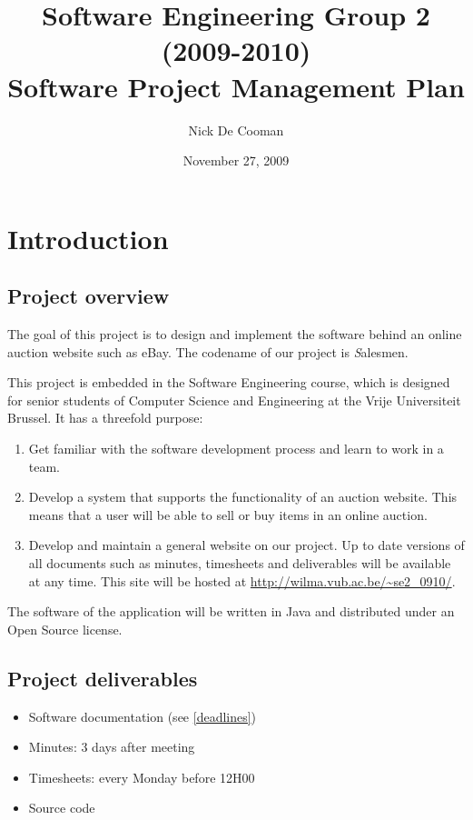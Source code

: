 \documentclass[a4paper, 12pt]{report}
\title{Software Engineering Group 2 (2009-2010) \\Software Project Management Plan}
\author{Nick De Cooman}
\date {November 27, 2009}
\begin{document}
	
	\maketitle
	
	\setcounter{tocdepth}{1}	
	\tableofcontents
	
	\chapter{Introduction}
	
		\section{Project overview}
		
			The goal of this project is to design and implement the software 
			behind an online auction website such as eBay. The codename of our project 
			is {\emph Salesmen}. 

			This project is embedded in the Software Engineering course, 
			which is designed for senior students of Computer Science and Engineering 
			at the Vrije Universiteit Brussel. It has a threefold purpose:
			
			\begin{enumerate}
				\item Get familiar with the software development process and learn to work
				in a team.
				
				\item Develop a system that supports the functionality of an auction website. 
				This means that a user will be able to sell or buy items in an online auction. 
				
				\item Develop and maintain a general website on our project. Up to date 
				versions of all documents such as minutes, timesheets and deliverables will be 
				available at any time. This site will be hosted at
				\url{http://wilma.vub.ac.be/~se2_0910/}.
			\end{enumerate}	
			
			The software of the application will be written in Java and 
			distributed under an Open Source license.	
		
		\section{Project deliverables}
		
		\begin{itemize}
			
			\item Software documentation (see \ref{deadlines})
			\item Minutes: 3 days after meeting
			\item Timesheets: every Monday before 12H00
			\item Source code
			
		\end{itemize}	
		
\end{document}
